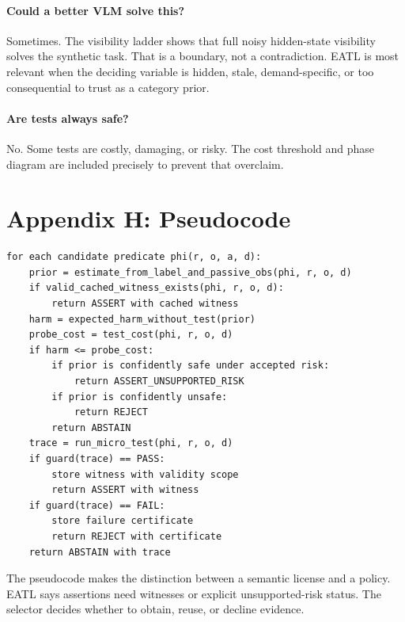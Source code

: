 \documentclass{article}
\begin{document}
\paragraph{Could a better VLM solve this?}
Sometimes.  The visibility ladder shows that full noisy hidden-state visibility
solves the synthetic task.  That is a boundary, not a contradiction.  EATL is
most relevant when the deciding variable is hidden, stale, demand-specific, or
too consequential to trust as a category prior.

\paragraph{Are tests always safe?}
No.  Some tests are costly, damaging, or risky.  The cost threshold and phase
diagram are included precisely to prevent that overclaim.

\section{Appendix H: Pseudocode}

\begin{verbatim}
for each candidate predicate phi(r, o, a, d):
    prior = estimate_from_label_and_passive_obs(phi, r, o, d)
    if valid_cached_witness_exists(phi, r, o, d):
        return ASSERT with cached witness
    harm = expected_harm_without_test(prior)
    probe_cost = test_cost(phi, r, o, d)
    if harm <= probe_cost:
        if prior is confidently safe under accepted risk:
            return ASSERT_UNSUPPORTED_RISK
        if prior is confidently unsafe:
            return REJECT
        return ABSTAIN
    trace = run_micro_test(phi, r, o, d)
    if guard(trace) == PASS:
        store witness with validity scope
        return ASSERT with witness
    if guard(trace) == FAIL:
        store failure certificate
        return REJECT with certificate
    return ABSTAIN with trace
\end{verbatim}

The pseudocode makes the distinction between a semantic license and a policy.
EATL says assertions need witnesses or explicit unsupported-risk status.  The
selector decides whether to obtain, reuse, or decline evidence.
\end{document}
